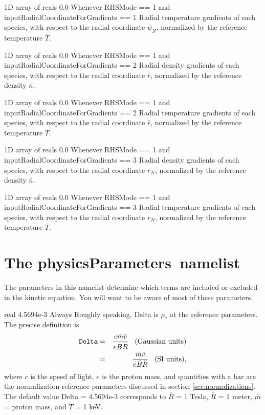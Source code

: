 \myhrule

{1D array of reals}
{0.0}
{Whenever {\ttfamily RHSMode} == 1 and {\ttfamily inputRadialCoordinateForGradients} == 1}
{Radial temperature gradients of each species, with respect to the radial coordinate $\psi_N$, normalized by the reference temperature $\bar{T}$.}

\myhrule

{1D array of reals}
{0.0}
{Whenever {\ttfamily RHSMode} == 1 and {\ttfamily inputRadialCoordinateForGradients} == 2}
{Radial density gradients of each species, with respect to the radial coordinate $\hat{r}$, normalized by the reference density $\bar{n}$.}

\myhrule

{1D array of reals}
{0.0}
{Whenever {\ttfamily RHSMode} == 1 and {\ttfamily inputRadialCoordinateForGradients} == 2}
{Radial temperature gradients of each species, with respect to the radial coordinate $\hat{r}$, normalized by the reference temperature $\bar{T}$.}

\myhrule

{1D array of reals}
{0.0}
{Whenever {\ttfamily RHSMode} == 1 and {\ttfamily inputRadialCoordinateForGradients} == 3}
{Radial density gradients of each species, with respect to the radial coordinate $r_N$, normalized by the reference density $\bar{n}$.}

\myhrule

{1D array of reals}
{0.0}
{Whenever {\ttfamily RHSMode} == 1 and {\ttfamily inputRadialCoordinateForGradients} == 3}
{Radial temperature gradients of each species, with respect to the radial coordinate $r_N$, normalized by the reference temperature $\bar{T}$.}










\section{The {\ttfamily physicsParameters}~namelist}

The parameters in this namelist determine which terms are included or excluded in the kinetic equation.
You will want to be aware of most of these parameters.

\myhrule

{real}
{4.5694e-3}
{Always}
{Roughly speaking, {\ttfamily Delta} is $\rho_*$ at the reference parameters. The precise definition is
\begin{eqnarray}
\mbox{\ttfamily Delta} 
&=& \frac{c \bar{m} \bar{v}}{e \bar{B} \bar{R}} \;\;\; \mbox{(Gaussian units)} \\
&=&  \frac{\bar{m} \bar{v}}{e \bar{B} \bar{R}} \;\;\; \mbox{(SI units)}, \nonumber
\end{eqnarray}
where $c$ is the speed of light,
$e$ is the proton mass,
and quantities with a bar are the normalization reference parameters discussed in section \ref{sec:normalizations}.
The default value {\ttfamily Delta} = 4.5694e-3 corresponds to $\bar{B}$ = 1 Tesla, $\bar{R}$ = 1 meter,
$\bar{m}$ = proton mass, and $\bar{T}$ = 1 keV.}

